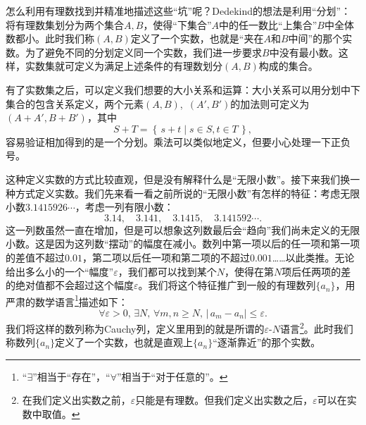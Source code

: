 \begin{center}
\end{center}


怎么利用有理数找到并精准地描述这些“坑”呢？Dedekind的想法是利用“分划”：将有理数集划分为两个集合$A,B$，使得“下集合”$A$中的任一数比“上集合”$B$中全体数都小。此时我们称$(A,B)$定义了一个实数，也就是“夹在$A$和$B$中间”的那个实数。为了避免不同的分划定义同一个实数，我们进一步要求$B$中没有最小数。这样，实数集就可定义为满足上述条件的有理数划分$(A,B)$构成的集合。

有了实数集之后，可以定义我们想要的大小关系和运算：大小关系可以用分划中下集合的包含关系定义，两个元素$(A,B)$,~$(A',B')$的加法则可定义为$(A+A',B+B')$，其中
\[S+T=\left\{ \,s+t\mid s\in S,t\in T\, \right\} ,\]
容易验证相加得到的是一个分划。乘法可以类似地定义，但要小心处理一下正负号。

这种定义实数的方式比较直观，但是没有解释什么是“无限小数”。接下来我们换一种方式定义实数。我们先来看一看之前所说的“无限小数”有怎样的特征：考虑无限小数$3.1415926\cdots$，考虑一列有限小数：
\[3.14,\quad3.141,\quad3.1415,\quad3.141592\cdots.\]
这一列数虽然一直在增加，但是可以想象这列数最后会“趋向”我们尚未定义的无限小数。这是因为这列数“摆动”的幅度在减小。数列中第一项以后的任一项和第一项的差值不超过$0.01$，第二项以后任一项和第二项的不超过$0.001$……以此类推。无论给出多么小的一个“幅度”$\varepsilon$，我们都可以找到某个$N$，使得在第$N$项后任两项的差的绝对值都不会超过这个幅度$\varepsilon$。我们将这个特征推广到一般的有理数列$\{a_n\}$，用严肃的数学语言\footnote{“$\exists$”相当于“存在”，“$\forall$”相当于“对于任意的”。}描述如下：
\[\forall \varepsilon>0,\,\exists N,\,\forall  m,n\geq N,\,|\,a_m-a_n|\leq \varepsilon.\]
我们将这样的数列称为Cauchy列，定义里用到的就是所谓的$\varepsilon$-$N$语言\footnote{在我们定义出实数之前，$\varepsilon$只能是有理数。但我们定义出实数之后，$\varepsilon$可以在实数中取值。}。此时我们称数列$\{a_n\}$定义了一个实数，也就是直观上$\{a_n\}$“逐渐靠近”的那个实数。

